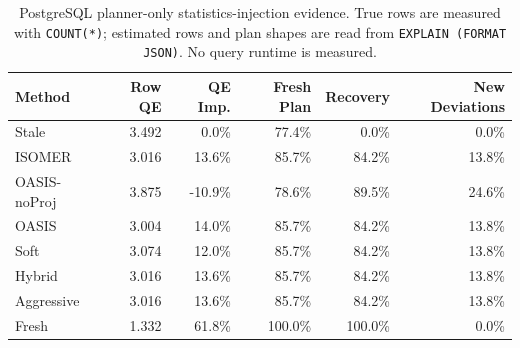 \begin{table}[t]
  \centering
  \small
  \caption{PostgreSQL planner-only statistics-injection evidence. True rows are measured with \texttt{COUNT(*)}; estimated rows and plan shapes are read from \texttt{EXPLAIN (FORMAT JSON)}. No query runtime is measured.}
  \label{tab:postgres_planner_stats_injection}
  \setlength{\tabcolsep}{4pt}
  \begin{tabular}{lrrrrr}
    \toprule
    Method & Row QE & QE Imp. & Fresh Plan & Recovery & New Deviations \\
    \midrule
    Stale & 3.492 & 0.0\% & 77.4\% & 0.0\% & 0.0\% \\
    ISOMER & 3.016 & 13.6\% & 85.7\% & 84.2\% & 13.8\% \\
    OASIS-noProj & 3.875 & -10.9\% & 78.6\% & 89.5\% & 24.6\% \\
    OASIS & 3.004 & 14.0\% & 85.7\% & 84.2\% & 13.8\% \\
    Soft & 3.074 & 12.0\% & 85.7\% & 84.2\% & 13.8\% \\
    Hybrid & 3.016 & 13.6\% & 85.7\% & 84.2\% & 13.8\% \\
    Aggressive & 3.016 & 13.6\% & 85.7\% & 84.2\% & 13.8\% \\
    Fresh & 1.332 & 61.8\% & 100.0\% & 100.0\% & 0.0\% \\
    \bottomrule
  \end{tabular}
\end{table}
